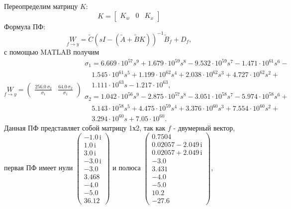 Переопределим матрицу $K$:
\begin{equation*}
    K=\begin{bmatrix}
        K_w&0&K_x
    \end{bmatrix}
\end{equation*}
Формула ПФ:
\begin{equation*}
    \underset{f\rightarrow y}{W}=\tilde C(sI-(\tilde A+\tilde BK))^{-1}\tilde B_f+D_f,
\end{equation*}
с помощью MATLAB получим
\begin{equation*}
    \underset{f\rightarrow y}{W} =
    \left(\begin{array}{cc}
        \frac{256.0\,\sigma_2}{\sigma_1} & \frac{64.0\,\sigma_2}{\sigma_1}
    \end{array}\right)
    \begin{array}{l}
        \sigma_1 = 6.669 \cdot 10^{57}s^9 + 1.679 \cdot 10^{59}s^8 - 9.532 \cdot 10^{59}s^7 - 1.471 \cdot 10^{61}s^6 -\\
        \quad 1.545 \cdot 10^{61}s^5 + 1.199 \cdot 10^{62}s^4 + 2.038 \cdot 10^{62}s^3 + 4.727 \cdot 10^{62}s^2 +\\
        \quad 1.111 \cdot 10^{63}s - 1.217 \cdot 10^{63},\\[8pt]
        \sigma_2 = 1.042 \cdot 10^{56}s^9 - 2.875 \cdot 10^{57}s^8 - 3.051 \cdot 10^{58}s^7 - 5.974 \cdot 10^{58}s^6 +\\
        \quad 5.143 \cdot 10^{58}s^5 + 4.475 \cdot 10^{59}s^4 + 3.376 \cdot 10^{60}s^3 + 7.554 \cdot 10^{60}s^2 +\\
        \quad 3.294 \cdot 10^{60}s + 7.05 \cdot 10^{60}.
    \end{array}
\end{equation*}
Данная ПФ представляет собой матрицу 1х2, так как $f$ - двумерный вектор, 
первая ПФ имеет нули $\left(\begin{array}{c}
-1.0\,\mathrm{i}\\
1.0\,\mathrm{i}\\
3.0\,\mathrm{i}\\
-3.0\,\mathrm{i}\\
-3.0\\
3.468\\
-4.0\\
-5.0\\
36.12
\end{array}\right)$ и полюса $\left(\begin{array}{c}
0.7504\\
0.02057-2.049\,\mathrm{i}\\
0.02057+2.049\,\mathrm{i}\\
-3.0\\
3.431\\
-4.0\\
-5.0\\
10.2\\
-27.6
\end{array}\right)$,

